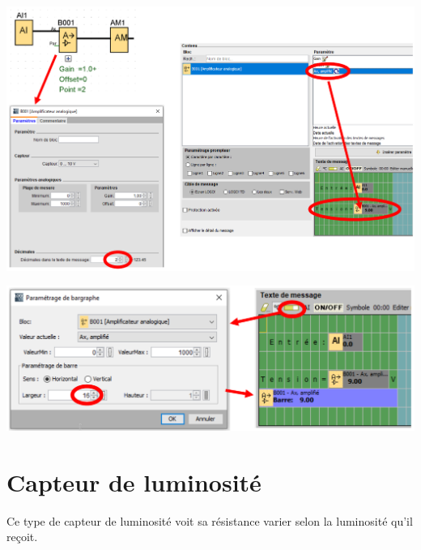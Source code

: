 \documentclass[11pt]{article}
\begin{document}
\begin{UPSTIactivite}
    \begin{center}
        \includegraphics[width=.9\textwidth]{images/TP04-decimales.png}
    \end{center}    
    \begin{center}
        \includegraphics[width=.9\textwidth]{images/TP04-ajoutBarre.png}
    \end{center}    
\end{UPSTIactivite}

\section{Capteur de luminosité}

Ce type de capteur de luminosité voit sa résistance varier selon la luminosité qu'il reçoit. 
\end{document}
